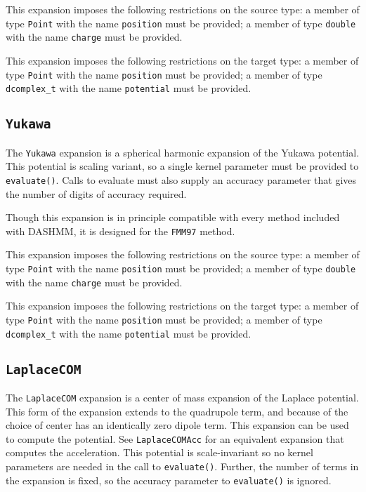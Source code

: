 This expansion imposes the following restrictions on the source type: a
member of type \texttt{Point} with the name \texttt{position} must be provided;
a member of type \texttt{double} with the name \texttt{charge} must be
provided.

This expansion imposes the following restrictions on the target type: a
member of type \texttt{Point} with the name \texttt{position} must be provided;
a member of type \texttt{dcomplex\_t} with the name \texttt{potential}
must be provided.

\subsection{\texttt{Yukawa}}

The \texttt{Yukawa} expansion is a spherical harmonic expansion of the Yukawa
potential. This potential is scaling variant, so a single kernel parameter
must be provided to \texttt{evaluate()}. Calls to evaluate must also supply an
accuracy parameter that gives the number of digits of accuracy required.

Though this expansion is in principle compatible with every method included
with DASHMM, it is designed for the \texttt{FMM97} method.

This expansion imposes the following restrictions on the source type: a
member of type \texttt{Point} with the name \texttt{position} must be provided;
a member of
type \texttt{double} with the name \texttt{charge} must be provided.

This expansion imposes the following restrictions on the target type: a
member of type \texttt{Point} with the name \texttt{position} must be provided;
a member of type \texttt{dcomplex\_t} with the name \texttt{potential}
 must be provided.

\subsection{\texttt{LaplaceCOM}}

The \texttt{LaplaceCOM} expansion is a center of mass expansion of the Laplace
potential. This form of the expansion extends to the quadrupole term, and
because of the choice of center has an identically zero dipole term. This
expansion can be used to compute the potential. See \texttt{LaplaceCOMAcc} for an
equivalent expansion that computes the acceleration. This potential is
scale-invariant so no kernel parameters are needed in the call to
\texttt{evaluate()}.
Further, the number of terms in the expansion is fixed, so the accuracy
parameter to \texttt{evaluate()} is ignored.

